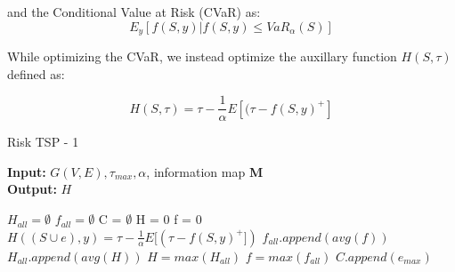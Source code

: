 \documentclass[conference]{IEEEtran}
\begin{document}
and the Conditional Value at Risk (CVaR) as:
\begin{equation}
E_y[f(S,y) | f(S,y) \leq VaR_\alpha(S)]
\end{equation}

While optimizing the CVaR, we instead optimize the auxillary function $H(S, \tau)$ defined as:

\begin{equation}
H(S, \tau) = \tau - \frac{1}{\alpha} E[(\tau - f(S,y)^{+}]
\end{equation}

\begin{algorithm}
  \caption{Risk TSP - 1}
  \hspace*{\algorithmicindent} \textbf{Input:} $G(V,E), \tau_{max}, \alpha$, information map \textbf{M} \\
 	\hspace*{\algorithmicindent} \textbf{Output:} $H$ 
  \begin{algorithmic}[1]
     	\State $H_{all} = \emptyset$
     	\State $f_{all} = \emptyset$
     	\State C = $\emptyset$
     	\State H = 0
     	\State f = 0
     			\State $H((S \cup e), y) = \tau - \frac{1}{\alpha} E[(\tau - f(S,y)^{+}])$
			\EndFor 
			\State $f_{all}.append(avg(f))$			
			\State $H_{all}.append(avg(H))$
     	\EndFor
     	\State $H = max(H_{all})$
     	\State $f = max(f_{all})$
     	\State $C.append(e_{max})$
     \EndWhile
  \end{algorithmic}
\end{algorithm}
\end{document}
